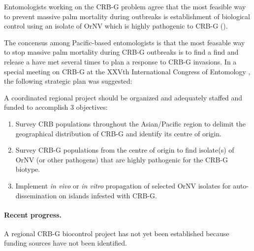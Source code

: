 \documentclass[12pt,letterpaper,english,bibliography=totocnumbered, abstract=on]{scrartcl}
\begin{document}
Entomologists working on the CRB-G problem agree that the most feasible
way to prevent massive palm mortality during outbreaks is establishment
of biological control using an isolate of OrNV which is highly pathogenic
to CRB-G (\cite{jackson_need_2015,vaqalo_pest_2015}).

The concensus among Pacific-based entomologists is that the most feasable
way to stop massive palm mortality during CRB-G outbreaks is to find
a find and release a have met several times to plan a response to
CRB-G invasions. In a special meeting on CRB-G at the XXVth International
Congress of Entomology 
, the following strategic
plan was suggested:

A coordinated regional project should be organized and adequately
staffed and funded to accomplish 3 objectives:

\begin{enumerate}
	
\item Survey CRB populations throughout the Asian/Pacific region to delimit
the geographical distribution of CRB-G and identify its centre of
origin.

\item Survey CRB-G populations from the centre of origin to find isolate(s)
of OrNV (or other pathogens) that are highly pathogenic for the CRB-G
biotype.

\item Implement \emph{in vivo} or \emph{in vitro} propagation of selected
OrNV isolates for auto-dissemination on islands infested with CRB-G.

\end{enumerate}

\paragraph{Recent progress.}

A regional CRB-G biocontrol project has not yet been established because
funding sources have not been identified.
\end{document}
